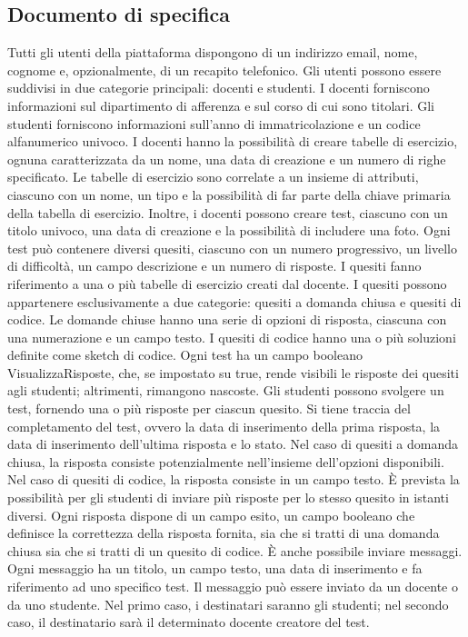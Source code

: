 \documentclass{article}
\begin{document}
\subsection{Documento di specifica}
\large
Tutti gli utenti della piattaforma dispongono di un indirizzo email, nome, cognome e, opzionalmente, di un recapito telefonico. Gli utenti possono essere suddivisi in due categorie principali: docenti e studenti. I docenti forniscono informazioni sul dipartimento di afferenza e sul corso di cui sono titolari.
Gli studenti forniscono informazioni sull'anno di immatricolazione e un codice alfanumerico univoco.
I docenti hanno la possibilità di creare tabelle di esercizio, ognuna caratterizzata da un nome, una data di creazione e un numero di righe specificato. Le tabelle di esercizio sono correlate a un insieme di attributi, ciascuno con un nome, un tipo e la possibilità di far parte della chiave primaria della tabella di esercizio.
Inoltre, i docenti possono creare test, ciascuno con un titolo univoco, una data di creazione e la possibilità di includere una foto. Ogni test può contenere diversi quesiti, ciascuno con un numero progressivo, un livello di difficoltà, un campo descrizione e un numero di risposte. I quesiti fanno riferimento a una o più tabelle di esercizio creati dal docente.
I quesiti possono appartenere esclusivamente a due categorie: quesiti a domanda chiusa e quesiti di codice. Le domande chiuse hanno una serie di opzioni di risposta, ciascuna con una numerazione e un campo testo. I quesiti di codice hanno una o più soluzioni definite come sketch di codice.
Ogni test ha un campo booleano VisualizzaRisposte, che, se impostato su true, rende visibili le risposte dei quesiti agli studenti; altrimenti, rimangono nascoste. Gli studenti possono svolgere un test, fornendo una o più risposte per ciascun quesito. Si tiene traccia del completamento del test, ovvero la data di inserimento della prima risposta, la data di inserimento dell'ultima risposta e lo stato.
Nel caso di quesiti a domanda chiusa, la risposta consiste potenzialmente nell'insieme dell'opzioni disponibili. Nel caso di quesiti di codice, la risposta consiste in un campo testo. È prevista la possibilità per gli studenti di inviare più risposte per lo stesso quesito in istanti diversi. Ogni risposta dispone di un campo esito, un campo booleano che definisce la correttezza della risposta fornita, sia che si tratti di una domanda chiusa sia che si tratti di un quesito di codice.
È anche possibile inviare messaggi. Ogni messaggio ha un titolo, un campo testo, una data di inserimento e fa riferimento ad uno specifico test. Il messaggio può essere inviato da un docente o da uno studente. Nel primo caso, i destinatari saranno gli studenti; nel secondo caso, il destinatario sarà il determinato docente creatore del test.
\end{document}
